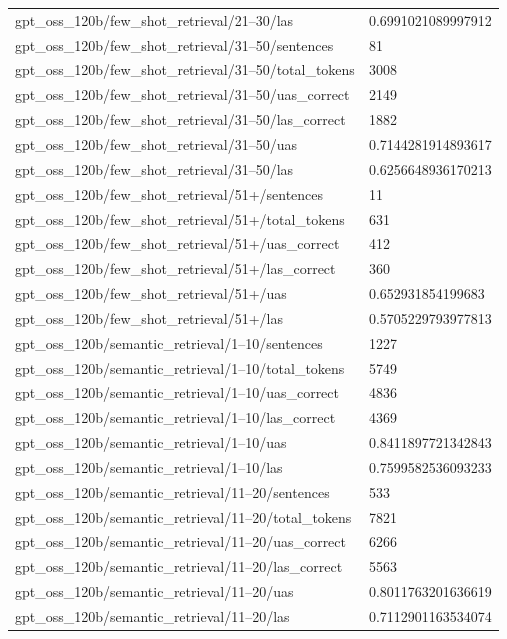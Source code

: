 \begin{tabular}{ll}
gpt\_oss\_120b/few\_shot\_retrieval/21–30/las & 0.6991021089997912 \\
gpt\_oss\_120b/few\_shot\_retrieval/31–50/sentences & 81 \\
gpt\_oss\_120b/few\_shot\_retrieval/31–50/total\_tokens & 3008 \\
gpt\_oss\_120b/few\_shot\_retrieval/31–50/uas\_correct & 2149 \\
gpt\_oss\_120b/few\_shot\_retrieval/31–50/las\_correct & 1882 \\
gpt\_oss\_120b/few\_shot\_retrieval/31–50/uas & 0.7144281914893617 \\
gpt\_oss\_120b/few\_shot\_retrieval/31–50/las & 0.6256648936170213 \\
gpt\_oss\_120b/few\_shot\_retrieval/51+/sentences & 11 \\
gpt\_oss\_120b/few\_shot\_retrieval/51+/total\_tokens & 631 \\
gpt\_oss\_120b/few\_shot\_retrieval/51+/uas\_correct & 412 \\
gpt\_oss\_120b/few\_shot\_retrieval/51+/las\_correct & 360 \\
gpt\_oss\_120b/few\_shot\_retrieval/51+/uas & 0.652931854199683 \\
gpt\_oss\_120b/few\_shot\_retrieval/51+/las & 0.5705229793977813 \\
gpt\_oss\_120b/semantic\_retrieval/1–10/sentences & 1227 \\
gpt\_oss\_120b/semantic\_retrieval/1–10/total\_tokens & 5749 \\
gpt\_oss\_120b/semantic\_retrieval/1–10/uas\_correct & 4836 \\
gpt\_oss\_120b/semantic\_retrieval/1–10/las\_correct & 4369 \\
gpt\_oss\_120b/semantic\_retrieval/1–10/uas & 0.8411897721342843 \\
gpt\_oss\_120b/semantic\_retrieval/1–10/las & 0.7599582536093233 \\
gpt\_oss\_120b/semantic\_retrieval/11–20/sentences & 533 \\
gpt\_oss\_120b/semantic\_retrieval/11–20/total\_tokens & 7821 \\
gpt\_oss\_120b/semantic\_retrieval/11–20/uas\_correct & 6266 \\
gpt\_oss\_120b/semantic\_retrieval/11–20/las\_correct & 5563 \\
gpt\_oss\_120b/semantic\_retrieval/11–20/uas & 0.8011763201636619 \\
gpt\_oss\_120b/semantic\_retrieval/11–20/las & 0.7112901163534074 \\

\end{tabular}
